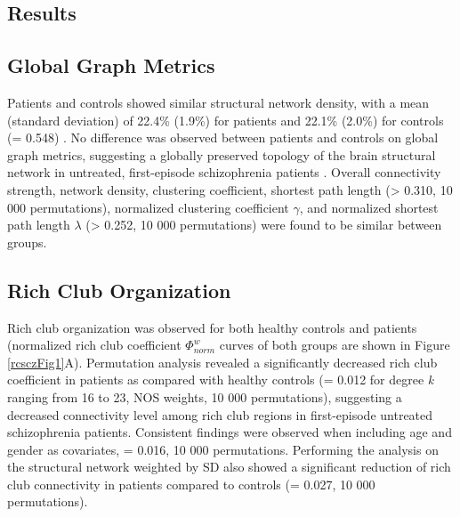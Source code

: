 \begin{refsection}
\section*{Results}
\subsection*{Global Graph Metrics}
Patients and controls showed similar structural network density, with a mean (standard deviation) of 22.4\% (1.9\%) for patients and 22.1\% (2.0\%) for controls (\pval = 0.548) \citep{vanDenHeuvel2017ProportionalTI}. No difference was observed between patients and controls on global graph metrics, suggesting a globally preserved topology of the brain structural network in untreated, first-episode schizophrenia patients \citep{Zhu2016AlterationsOF,Collin2017AffectedAR}. Overall connectivity strength, network density, clustering coefficient, shortest path length (\pval > 0.310, 10 000 permutations), normalized clustering coefficient $\gamma$, and normalized shortest path length $\lambda$ (\pval > 0.252, 10 000 permutations) were found to be similar between groups.

\subsection*{Rich Club Organization}
Rich club organization was observed for both healthy controls and patients (normalized rich club coefficient ${\Phi}^{w}_{norm}$ curves of both groups are shown in Figure \ref{rcsczFig1}A). Permutation analysis revealed a significantly decreased rich club coefficient in patients as compared with healthy controls (\pval = 0.012 for degree \textit{k} ranging from 16 to 23, NOS weights, 10 000 permutations), suggesting a decreased connectivity level among rich club regions in first-episode untreated schizophrenia patients. Consistent findings were observed when including age and gender as covariates, \pval = 0.016, 10 000 permutations. Performing the analysis on the structural network weighted by SD also showed a significant reduction of rich club connectivity in patients compared to controls (\pval = 0.027, 10 000 permutations).


\end{refsection}
